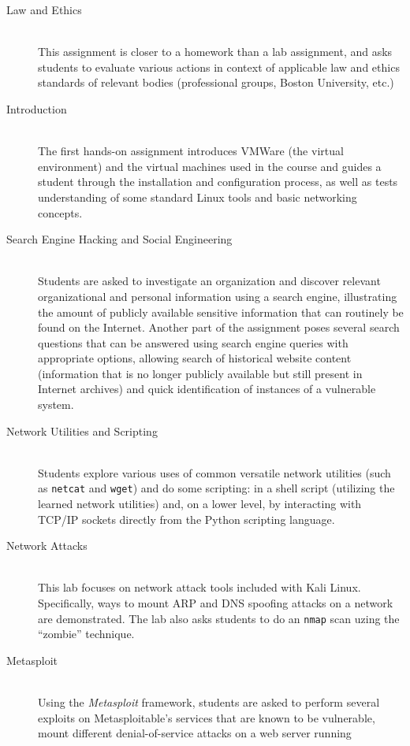 \documentclass{sig-alternate-2013}
\begin{document}
\begin{description}
\item[Law and Ethics] \hfill \\
This assignment is closer to a homework than a lab assignment, and asks students to evaluate various actions
in context of applicable law and ethics standards of relevant bodies (professional groups, Boston University, etc.)
\item[Introduction] \hfill \\
The first hands-on assignment introduces VMWare (the virtual environment) and the virtual machines used in the course
and guides a student through the installation and configuration process, as well as tests understanding of some
standard Linux tools and basic networking concepts.
\item[Search Engine Hacking and Social Engineering] \hfill \\
Students are asked to investigate an organization and discover relevant organizational and personal information
using a search engine, illustrating the amount of publicly available sensitive information that can routinely be found on the
Internet. Another part of the assignment poses several search questions that can be answered using search engine
queries with appropriate options, allowing search of historical website content (information that is no longer publicly
available but still present in Internet archives) and quick identification of instances of a vulnerable system.
\item[Network Utilities and Scripting] \hfill \\
Students explore various uses of common versatile network utilities (such as \texttt{netcat} and \texttt{wget}) and do some
scripting: in a shell script (utilizing the learned network utilities) and, on a lower level, by interacting with TCP/IP
sockets directly from the Python scripting language.
\item[Network Attacks] \hfill \\
This lab focuses on network attack tools included with Kali Linux. Specifically, ways to mount ARP and DNS
spoofing attacks on a network are demonstrated. The lab also asks students to do an \texttt{nmap} scan
uzing the ``zombie'' technique.
\item[Metasploit] \hfill \\ 
Using the \emph{Metasploit} framework, students are asked to perform several exploits on Metasploitable's
services that are known to be vulnerable, mount different denial-of-service attacks on a web server running

\end{description}
\end{document}
